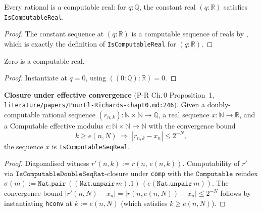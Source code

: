 \begin{lemma}
  \label{lem:l1_isComputableReal_ofRat}
  \leanok
  Every rational is a computable real: for $q : \mathbb{Q}$, the constant real $(q : \mathbb{R})$ satisfies \texttt{IsComputableReal}.
\end{lemma}
\begin{proof}\leanok
  The constant sequence at $(q : \mathbb{R})$ is a computable sequence of reals by , which is exactly the definition of \texttt{IsComputableReal} for $(q : \mathbb{R})$.
\end{proof}

\begin{lemma}
  \label{lem:l1_isComputableReal_zero}
  \leanok
  Zero is a computable real.
\end{lemma}
\begin{proof}\leanok
  Instantiate  at $q = 0$, using $((0 : \mathbb{Q}) : \mathbb{R}) = 0$.
\end{proof}

\begin{lemma}
  \label{lem:l1_isComputableSeqReal_of_effectiveConvergence}
  \leanok
  \textbf{Closure under effective convergence} (P-R Ch.\,0 Proposition~1, \texttt{literature/papers/PourEl-Richards-chapt0.md:246}). Given a doubly-computable rational sequence $(r_{n,k}) : \mathbb{N} \times \mathbb{N} \to \mathbb{Q}$, a real sequence $x : \mathbb{N} \to \mathbb{R}$, and a Computable effective modulus $e : \mathbb{N} \times \mathbb{N} \to \mathbb{N}$ with the convergence bound
  $$k \ge e(n, N) \;\Longrightarrow\; |r_{n,k} - x_n| \le 2^{-N},$$
  the sequence $x$ is \texttt{IsComputableSeqReal}.
\end{lemma}
\begin{proof}\leanok
  Diagonalised witness $r'(n, k) := r(n,\, e(n,k))$. Computability of $r'$ via $\texttt{IsComputableDoubleSeqRat}$-closure under \texttt{comp} with the $\texttt{Computable}$ reindex $\sigma(m) := \texttt{Nat.pair}\,((\texttt{Nat.unpair}\,m).1)\,(e(\texttt{Nat.unpair}\,m))$. The convergence bound $|r'(n, N) - x_n| = |r(n, e(n, N)) - x_n| \le 2^{-N}$ follows by instantiating \texttt{hconv} at $k := e(n, N)$ (which satisfies $k \ge e(n, N)$).
\end{proof}

